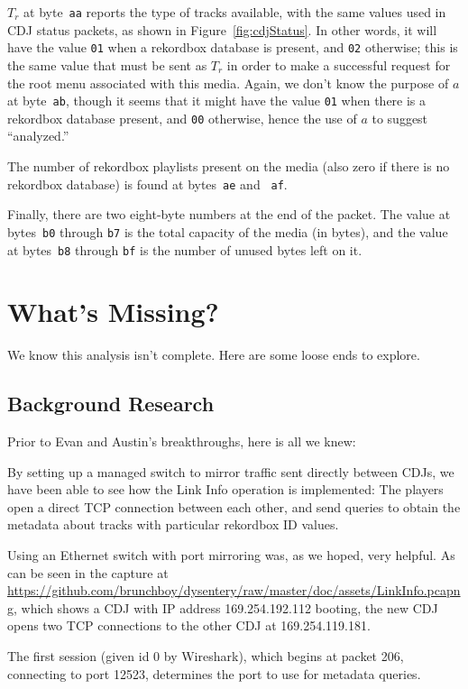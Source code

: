 \documentclass[11pt]{article}
\begin{document}
$T_r$ at byte~{\tt aa} reports the type of tracks available, with the
same values used in CDJ status packets, as shown in
Figure~\ref{fig:cdjStatus}. In other words, it will have the value
{\tt 01} when a rekordbox database is present, and {\tt 02} otherwise;
this is the same value that must be sent as $T_r$ in order to make a
successful request for the root menu associated with this media.
Again, we don't know the purpose of $a$ at byte~{\tt ab}, though it
seems that it might have the value {\tt 01} when there is a rekordbox
database present, and {\tt 00} otherwise, hence the use of $a$ to
suggest ``analyzed.''

The number of rekordbox playlists present on the media (also zero if
there is no rekordbox database) is found at bytes~{\tt ae} and {\tt
  af}.

Finally, there are two eight-byte numbers at the end of the packet.
The value at bytes~{\tt b0} through {\tt b7} is the total capacity of
the media (in bytes), and the value at bytes~{\tt b8} through {\tt bf}
is the number of unused bytes left on it.

\section{What's Missing?}

We know this analysis isn't complete. Here are some loose ends to
explore.

\subsection{Background Research}

Prior to Evan and Austin's breakthroughs, here is all we knew:

By setting up a managed switch to mirror traffic sent directly between
CDJs, we have been able to see how the Link Info operation is
implemented: The players open a direct TCP connection between each
other, and send queries to obtain the metadata about tracks with
particular rekordbox ID values.

Using an Ethernet switch
with port mirroring was, as we hoped, very helpful. As can be seen in
the capture at
\url{https://github.com/brunchboy/dysentery/raw/master/doc/assets/LinkInfo.pcapng},
which shows a CDJ with IP address 169.254.192.112 booting, the new CDJ
opens two TCP connections to the other CDJ at 169.254.119.181.

The first session (given id 0 by Wireshark), which begins at packet
206, connecting to port 12523, determines the port to use for metadata
queries.
\end{document}
